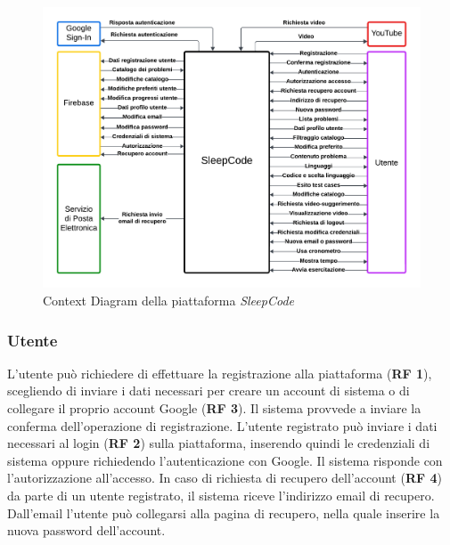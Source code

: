\documentclass[11pt, a4paper]{article}
\theoremstyle{definition} %
\begin{document}
\begin{figure}[H]
\centering
\hspace*{-2.1cm}
\includegraphics[scale=0.65]{materiale/contextdiagram.pdf}
\caption{Context Diagram della piattaforma \textit{SleepCode}}
\label{contextdiagram}
\end{figure}

\subsubsection*{Utente}
L'utente può richiedere di effettuare la registrazione alla piattaforma
(\textbf{RF 1}), scegliendo di inviare i dati necessari per creare un
account di sistema o di collegare il proprio account Google (\textbf{RF 3}). Il sistema
provvede a inviare la conferma dell'operazione di registrazione.
L'utente registrato può inviare i dati necessari al login (\textbf{RF 2}) sulla piattaforma,
inserendo quindi le credenziali di sistema oppure richiedendo l'autenticazione
con Google. Il sistema risponde con l'autorizzazione all'accesso.
In caso di richiesta di recupero dell'account (\textbf{RF 4}) da parte di un utente
registrato, il sistema riceve l'indirizzo email di recupero. Dall'email
l'utente può collegarsi alla pagina di recupero, nella quale inserire la
nuova password dell'account.
\end{document}
